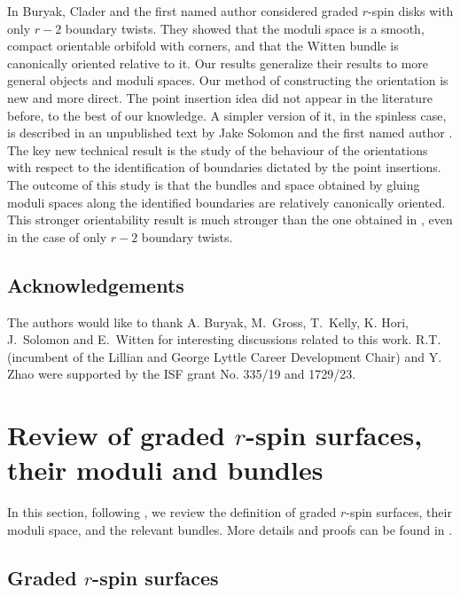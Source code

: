 \documentclass[11pt,a4paper]{article}
\theoremstyle{definition}
\theoremstyle{remark}
\numberwithin{equation}{section}
\begin{document}
In \cite{BCT1} Buryak, Clader and the first named author considered graded $r$-spin disks with only $r-2$ boundary twists. They showed that the moduli space is a smooth, compact orientable orbifold with corners, and that the Witten bundle is canonically oriented relative to it. Our results generalize their results to more general objects and moduli spaces. Our method of constructing the orientation is new and more direct.
The point insertion idea did not appear in the literature before, to the best of our knowledge.  
A simpler version of it, in the spinless case, is described in an unpublished text by Jake Solomon and the first named author \cite{ST_unpublished}.
The key new technical result is the study of the behaviour of the orientations with respect to the identification of boundaries dictated by the point insertions. The outcome of this study is that the bundles and space obtained by gluing moduli spaces along the identified boundaries are relatively canonically oriented. This stronger orientability result is much stronger than the one obtained in \cite{BCT1}, even in the case of only $r-2$ boundary twists.


\subsection{Acknowledgements}
The authors would like to thank A. Buryak, M.~Gross, T.~Kelly, K. Hori, J.~Solomon and E.~Witten for interesting discussions related to this work.  
R.T. (incumbent of the Lillian and George Lyttle Career Development Chair) and Y. Zhao were supported by the ISF grant No. 335/19 and 1729/23.




\section{Review of graded $r$-spin surfaces, their moduli and bundles}
\label{sec review}

In this section, following \cite{BCT1}, we review the definition of graded $r$-spin surfaces, their moduli space, and the relevant bundles.  More details and proofs can be found in \cite{BCT1}.




\subsection{Graded $r$-spin surfaces}
\end{document}
